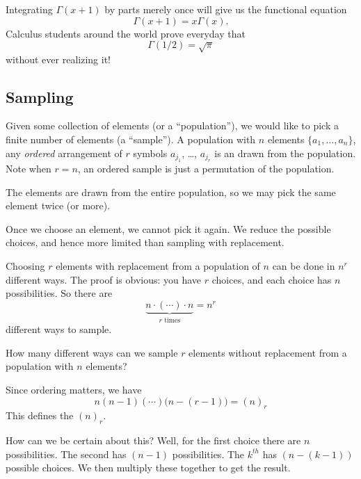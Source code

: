 Integrating $\Gamma(x+1)$ by parts merely once will give us the
functional equation
\begin{equation}
\Gamma(x+1)=x\Gamma(x).
\end{equation}
Calculus students around the world prove everyday that
\begin{equation}
\Gamma(1/2)=\sqrt{\pi}
\end{equation}
without ever realizing it!

\subsection{Sampling}
\M
Given some collection of elements (or a ``population''), we would like
to pick a finite number of elements (a ``sample''). A population with
$n$ elements $\{a_{1},\dots,a_{n}\}$, any \emph{ordered} arrangement of
$r$ symbols $a_{j_{1}}$, \dots, $a_{j_r}$ is an  drawn from the population. Note when $r=n$, an ordered
sample is just a permutation of the population.

The elements are drawn from the entire population, so we may pick the
same element twice (or more).

Once we choose an element, we cannot pick it again. We reduce the
possible choices, and hence more limited than sampling with replacement.

\medbreak
Choosing $r$ elements with replacement from a population of $n$ can be
done in $n^{r}$ different ways. The proof is obvious: you have $r$
choices, and each choice has $n$ possibilities. So there are 
\begin{equation}
\underbrace{n\cdot(\cdots)\cdot n}_{\text{$r$ times}} = n^{r}
\end{equation}
different ways to sample.

How many different ways can we sample $r$ elements without replacement
from a population with $n$ elements? 

\M
Since ordering matters, we have
\begin{equation}
n(n-1)(\cdots)\bigl(n-(r-1)\bigr)=(n)_{r}
\end{equation}
This defines the  $(n)_{r}$.

How can we be certain about this? Well, for the first choice there are
$n$ possibilities. The second has $(n-1)$ possibilities. The $k^{th}$
has $(n-(k-1))$ possible choices. We then multiply these together to get
the result.

